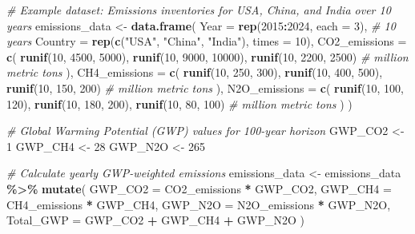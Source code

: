 \documentclass[
]{article}
\newenvironment{Shaded}{\begin{snugshade}}{\end{snugshade}}
\newcommand{\AttributeTok}[1]{\textcolor[rgb]{0.13,0.29,0.53}{#1}}
\newcommand{\CommentTok}[1]{\textcolor[rgb]{0.56,0.35,0.01}{\textit{#1}}}
\newcommand{\DecValTok}[1]{\textcolor[rgb]{0.00,0.00,0.81}{#1}}
\newcommand{\FunctionTok}[1]{\textcolor[rgb]{0.13,0.29,0.53}{\textbf{#1}}}
\newcommand{\NormalTok}[1]{#1}
\newcommand{\OtherTok}[1]{\textcolor[rgb]{0.56,0.35,0.01}{#1}}
\newcommand{\SpecialCharTok}[1]{\textcolor[rgb]{0.81,0.36,0.00}{\textbf{#1}}}
\newcommand{\StringTok}[1]{\textcolor[rgb]{0.31,0.60,0.02}{#1}}
\begin{document}
\begin{Shaded}
\begin{Highlighting}[]
\CommentTok{\# Example dataset: Emissions inventories for USA, China, and India over 10 years}
\NormalTok{emissions\_data }\OtherTok{\textless{}{-}} \FunctionTok{data.frame}\NormalTok{(}
  \AttributeTok{Year =} \FunctionTok{rep}\NormalTok{(}\DecValTok{2015}\SpecialCharTok{:}\DecValTok{2024}\NormalTok{, }\AttributeTok{each =} \DecValTok{3}\NormalTok{), }\CommentTok{\# 10 years}
  \AttributeTok{Country =} \FunctionTok{rep}\NormalTok{(}\FunctionTok{c}\NormalTok{(}\StringTok{"USA"}\NormalTok{, }\StringTok{"China"}\NormalTok{, }\StringTok{"India"}\NormalTok{), }\AttributeTok{times =} \DecValTok{10}\NormalTok{),}
  \AttributeTok{CO2\_emissions =} \FunctionTok{c}\NormalTok{(}
    \FunctionTok{runif}\NormalTok{(}\DecValTok{10}\NormalTok{, }\DecValTok{4500}\NormalTok{, }\DecValTok{5000}\NormalTok{), }\FunctionTok{runif}\NormalTok{(}\DecValTok{10}\NormalTok{, }\DecValTok{9000}\NormalTok{, }\DecValTok{10000}\NormalTok{), }\FunctionTok{runif}\NormalTok{(}\DecValTok{10}\NormalTok{, }\DecValTok{2200}\NormalTok{, }\DecValTok{2500}\NormalTok{) }\CommentTok{\# million metric tons}
\NormalTok{  ),}
  \AttributeTok{CH4\_emissions =} \FunctionTok{c}\NormalTok{(}
    \FunctionTok{runif}\NormalTok{(}\DecValTok{10}\NormalTok{, }\DecValTok{250}\NormalTok{, }\DecValTok{300}\NormalTok{), }\FunctionTok{runif}\NormalTok{(}\DecValTok{10}\NormalTok{, }\DecValTok{400}\NormalTok{, }\DecValTok{500}\NormalTok{), }\FunctionTok{runif}\NormalTok{(}\DecValTok{10}\NormalTok{, }\DecValTok{150}\NormalTok{, }\DecValTok{200}\NormalTok{) }\CommentTok{\# million metric tons}
\NormalTok{  ),}
  \AttributeTok{N2O\_emissions =} \FunctionTok{c}\NormalTok{(}
    \FunctionTok{runif}\NormalTok{(}\DecValTok{10}\NormalTok{, }\DecValTok{100}\NormalTok{, }\DecValTok{120}\NormalTok{), }\FunctionTok{runif}\NormalTok{(}\DecValTok{10}\NormalTok{, }\DecValTok{180}\NormalTok{, }\DecValTok{200}\NormalTok{), }\FunctionTok{runif}\NormalTok{(}\DecValTok{10}\NormalTok{, }\DecValTok{80}\NormalTok{, }\DecValTok{100}\NormalTok{) }\CommentTok{\# million metric tons}
\NormalTok{  )}
\NormalTok{)}

\CommentTok{\# Global Warming Potential (GWP) values for 100{-}year horizon}
\NormalTok{GWP\_CO2 }\OtherTok{\textless{}{-}} \DecValTok{1}
\NormalTok{GWP\_CH4 }\OtherTok{\textless{}{-}} \DecValTok{28}
\NormalTok{GWP\_N2O }\OtherTok{\textless{}{-}} \DecValTok{265}

\CommentTok{\# Calculate yearly GWP{-}weighted emissions}
\NormalTok{emissions\_data }\OtherTok{\textless{}{-}}\NormalTok{ emissions\_data }\SpecialCharTok{\%\textgreater{}\%}
  \FunctionTok{mutate}\NormalTok{(}
    \AttributeTok{GWP\_CO2 =}\NormalTok{ CO2\_emissions }\SpecialCharTok{*}\NormalTok{ GWP\_CO2,}
    \AttributeTok{GWP\_CH4 =}\NormalTok{ CH4\_emissions }\SpecialCharTok{*}\NormalTok{ GWP\_CH4,}
    \AttributeTok{GWP\_N2O =}\NormalTok{ N2O\_emissions }\SpecialCharTok{*}\NormalTok{ GWP\_N2O,}
    \AttributeTok{Total\_GWP =}\NormalTok{ GWP\_CO2 }\SpecialCharTok{+}\NormalTok{ GWP\_CH4 }\SpecialCharTok{+}\NormalTok{ GWP\_N2O}
\NormalTok{  )}


\end{Highlighting}
\end{Shaded}
\end{document}
